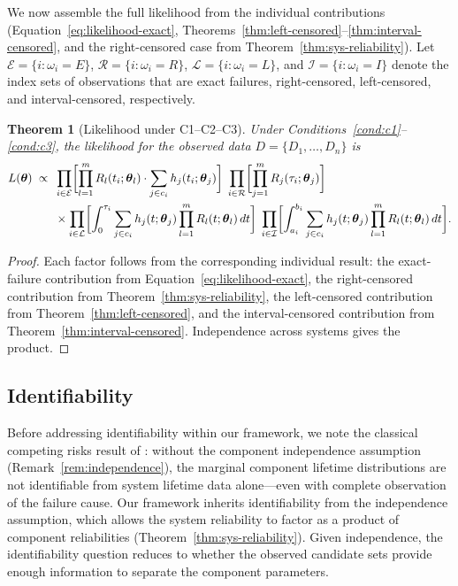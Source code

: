 \documentclass[11pt]{article}
\theoremstyle{definition}
\theoremstyle{plain}
\newtheorem{theorem}{Theorem}
\renewcommand{\v}[1]{\boldsymbol{#1}}
\newcommand{\btheta}{\v{\theta}}
\begin{document}
We now assemble the full likelihood from the individual contributions
(Equation~\eqref{eq:likelihood-exact},
Theorems~\ref{thm:left-censored}--\ref{thm:interval-censored}, and the
right-censored case from Theorem~\ref{thm:sys-reliability}).
Let $\mathcal{E} = \{i : \omega_i = E\}$,
$\mathcal{R} = \{i : \omega_i = R\}$,
$\mathcal{L} = \{i : \omega_i = L\}$, and
$\mathcal{I} = \{i : \omega_i = I\}$ denote the
index sets of observations that are exact failures, right-censored,
left-censored, and interval-censored, respectively.

\begin{theorem}[Likelihood under C1--C2--C3]
\label{thm:likelihood-contribution}
Under Conditions~\ref{cond:c1}--\ref{cond:c3}, the likelihood for the
observed data $D = \{D_1, \ldots, D_n\}$ is
\begin{align}
\label{eq:combined-likelihood}
    L(\btheta) \;\propto\;\;
    &\prod_{i \in \mathcal{E}}
        \biggl[\prod_{l=1}^m R_l(t_i; \v{\theta}_l)
        \cdot \sum_{j \in c_i} h_j(t_i; \v{\theta}_j)\biggr]
    \;\prod_{i \in \mathcal{R}}
        \biggl[\prod_{j=1}^m R_j(\tau_i; \v{\theta}_j)\biggr]
        \notag \\
    &\times
    \prod_{i \in \mathcal{L}}
        \biggl[\int_0^{\tau_i}
        \sum_{j \in c_i} h_j(t; \v{\theta}_j)
        \prod_{l=1}^m R_l(t; \v{\theta}_l) \, dt\biggr]
    \;\prod_{i \in \mathcal{I}}
        \biggl[\int_{a_i}^{b_i}
        \sum_{j \in c_i} h_j(t; \v{\theta}_j)
        \prod_{l=1}^m R_l(t; \v{\theta}_l) \, dt\biggr].
\end{align}
\end{theorem}

\begin{proof}
Each factor follows from the corresponding individual result:
the exact-failure contribution from Equation~\eqref{eq:likelihood-exact},
the right-censored contribution from
Theorem~\ref{thm:sys-reliability},
the left-censored contribution from
Theorem~\ref{thm:left-censored}, and the interval-censored contribution
from Theorem~\ref{thm:interval-censored}.
Independence across systems gives the product.
\end{proof}

\subsection{Identifiability}
\label{sec:identifiability}

Before addressing identifiability within our framework, we note the
classical competing risks result of \citet{tsiatis1975}: without the
component independence assumption (Remark~\ref{rem:independence}),
the marginal component lifetime distributions are not identifiable from
system lifetime data alone---even with complete observation of the
failure cause.
Our framework inherits identifiability from the independence assumption,
which allows the system reliability to factor as a product of component
reliabilities (Theorem~\ref{thm:sys-reliability}).
Given independence, the identifiability question reduces to whether the
observed candidate sets provide enough information to separate the
component parameters.
\end{document}
